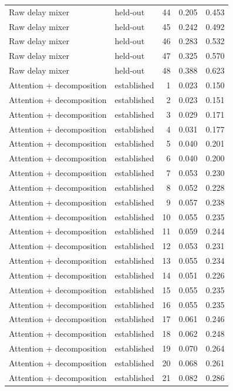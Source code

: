 \begin{tabular}{llrrr}
Raw delay mixer & held-out & 44 & 0.205 & 0.453 \\
Raw delay mixer & held-out & 45 & 0.242 & 0.492 \\
Raw delay mixer & held-out & 46 & 0.283 & 0.532 \\
Raw delay mixer & held-out & 47 & 0.325 & 0.570 \\
Raw delay mixer & held-out & 48 & 0.388 & 0.623 \\
Attention + decomposition & established & 1 & 0.023 & 0.150 \\
Attention + decomposition & established & 2 & 0.023 & 0.151 \\
Attention + decomposition & established & 3 & 0.029 & 0.171 \\
Attention + decomposition & established & 4 & 0.031 & 0.177 \\
Attention + decomposition & established & 5 & 0.040 & 0.201 \\
Attention + decomposition & established & 6 & 0.040 & 0.200 \\
Attention + decomposition & established & 7 & 0.053 & 0.230 \\
Attention + decomposition & established & 8 & 0.052 & 0.228 \\
Attention + decomposition & established & 9 & 0.057 & 0.238 \\
Attention + decomposition & established & 10 & 0.055 & 0.235 \\
Attention + decomposition & established & 11 & 0.059 & 0.244 \\
Attention + decomposition & established & 12 & 0.053 & 0.231 \\
Attention + decomposition & established & 13 & 0.055 & 0.234 \\
Attention + decomposition & established & 14 & 0.051 & 0.226 \\
Attention + decomposition & established & 15 & 0.055 & 0.235 \\
Attention + decomposition & established & 16 & 0.055 & 0.235 \\
Attention + decomposition & established & 17 & 0.061 & 0.246 \\
Attention + decomposition & established & 18 & 0.062 & 0.248 \\
Attention + decomposition & established & 19 & 0.070 & 0.264 \\
Attention + decomposition & established & 20 & 0.068 & 0.261 \\
Attention + decomposition & established & 21 & 0.082 & 0.286 \\

\end{tabular}
